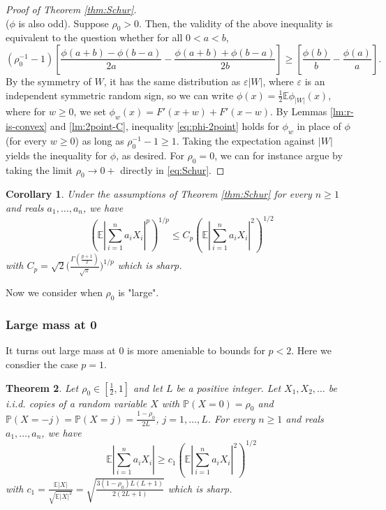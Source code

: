 \documentclass[10pt]{article}
\newcommand{\E}{\mathbb{E}}
\newcommand{\1}{\textbf{1}}
\newcommand{\p}[1]{\mathbb{P}\left( #1 \right)}
\newtheorem{theorem}{Theorem}
\newtheorem{corollary}[theorem]{Corollary}
\theoremstyle{remark}
\theoremstyle{definition}
\begin{document}
\begin{proof}[Proof of Theorem \ref{thm:Schur}]
\[\]
($\phi$ is also odd). Suppose $\rho_0 > 0$. Then, the validity of the above inequality is equivalent to the question whether for all $0 < a < b$,
\begin{equation}\label{eq:phi-2point}
(\rho_0^{-1}-1)\left[\frac{\phi(a+b)-\phi(b-a)}{2a} - \frac{\phi(a+b)+\phi(b-a)}{2b}\right] \geq \left[ \frac{\phi(b)}{b}-\frac{\phi(a)}{a}\right].
\end{equation}
By the symmetry of $W$, it has the same distribution as $\varepsilon |W|$, where $\varepsilon$ is an independent symmetric random sign, so we can write $\phi(x) = \frac{1}{2}\E\phi_{|W|}(x)$, where for $w \geq 0$, we set $\phi_w(x) = F'(x+w) + F'(x-w)$. By Lemmas \ref{lm:r-is-convex} and \ref{lm:2point-C}, inequality \eqref{eq:phi-2point} holds for $\phi_w$ in place of $\phi$ (for every $w \geq 0$) as long as $\rho_0^{-1} - 1 \geq 1$. Taking the expectation against $|W|$ yields the inequality for $\phi$, as desired. For $\rho_0 =0$, we can for instance argue by taking the limit $\rho_0 \to 0+$ directly in \eqref{eq:Schur}.
\end{proof}

\begin{corollary}
Under the assumptions of Theorem \ref{thm:Schur} for every $n \geq 1$ and reals $a_1,\ldots,a_n$, we have
\begin{equation}\label{eq:2-p>3'}
\left(\E\left|\sum_{i=1}^n a_iX_i \right|^p\right)^{1/p} \leq C_p \left(\E\left|\sum_{i=1}^n a_iX_i \right|^2\right)^{1/2} 
\end{equation}
with $C_p = \sqrt{2} \Big(\frac{\Gamma (\frac{p+1}{2})}{\sqrt{\pi}} \Big)^{1/p}$ which is sharp.
\end{corollary}

Now we consider when $\rho_0$ is "large".

\subsubsection{Large mass at 0}

It turns out large mass at 0 is more ameniable to bounds for $p < 2$. Here we consdier the case $p=1$. 

\begin{theorem}\label{thm:L1-L2}
Let $\rho_0 \in [\frac{1}{2},1]$ and let $L$ be a positive integer. Let $X_1,X_2,\ldots$ be i.i.d. copies of a random variable $X$ with $\p{X = 0} = \rho_0$ and $\p{X = -j} = \p{X = j} = \frac{1-\rho_0}{2L}$, $j = 1, \ldots, L$. For every $n \geq 1$ and reals $a_1,\ldots,a_n$, we have
\begin{equation}\label{eq:L1-L2}
\E\left|\sum_{i=1}^n a_iX_i \right| \geq c_1\left(\E\left|\sum_{i=1}^n a_iX_i \right|^2\right)^{1/2} 
\end{equation}
with $c_1 = \frac{\E|X|}{\sqrt{\E|X|^2}} = \sqrt{\frac{3(1-\rho_0)L(L+1)}{2(2L+1)}}$ which is sharp.
\end{theorem}
\end{document}
